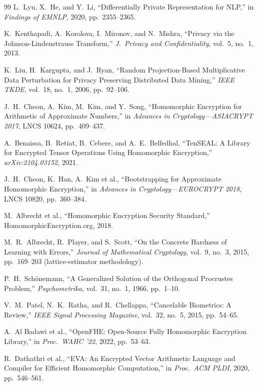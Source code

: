 \documentclass[11pt,a4paper]{article}
\begin{document}
\begin{thebibliography}{99}
 L.\ Lyu, X.\ He, and Y.\ Li, ``Differentially Private
Representation for NLP,'' in \emph{Findings of EMNLP}, 2020,
pp.\ 2355--2365.

 K.\ Kenthapadi, A.\ Korolova, I.\ Mironov, and
N.\ Mishra, ``Privacy via the Johnson-Lindenstrauss Transform,''
\emph{J.\ Privacy and Confidentiality}, vol.\ 5, no.\ 1, 2013.

 K.\ Liu, H.\ Kargupta, and J.\ Ryan,
``Random Projection-Based Multiplicative Data Perturbation for Privacy
Preserving Distributed Data Mining,'' \emph{IEEE TKDE}, vol.\ 18,
no.\ 1, 2006, pp.\ 92--106.

 J.\ H.\ Cheon, A.\ Kim, M.\ Kim, and Y.\ Song,
``Homomorphic Encryption for Arithmetic of Approximate Numbers,'' in
\emph{Advances in Cryptology---ASIACRYPT 2017}, LNCS 10624, pp.\ 409--437.

 A.\ Benaissa, B.\ Retiat, B.\ Cebere, and A.\ E.\
Belfedhal, ``TenSEAL: A Library for Encrypted Tensor Operations Using
Homomorphic Encryption,'' \emph{arXiv:2104.03152}, 2021.

 J.\ H.\ Cheon, K.\ Han, A.\ Kim et al.,
``Bootstrapping for Approximate Homomorphic Encryption,'' in
\emph{Advances in Cryptology---EUROCRYPT 2018}, LNCS 10820,
pp.\ 360--384.

 M.\ Albrecht et al., ``Homomorphic Encryption
Security Standard,'' HomomorphicEncryption.org, 2018.

 M.\ R.\ Albrecht, R.\ Player, and S.\ Scott,
``On the Concrete Hardness of Learning with Errors,'' \emph{Journal of
Mathematical Cryptology}, vol.\ 9, no.\ 3, 2015, pp.\ 169--203
(lattice-estimator methodology).

 P.\ H.\ Sch\"onemann, ``A Generalized Solution
of the Orthogonal Procrustes Problem,'' \emph{Psychometrika}, vol.\ 31,
no.\ 1, 1966, pp.\ 1--10.

 V.\ M.\ Patel, N.\ K.\ Ratha, and R.\ Chellappa,
``Cancelable Biometrics: A Review,'' \emph{IEEE Signal Processing
Magazine}, vol.\ 32, no.\ 5, 2015, pp.\ 54--65.

 A.\ Al Badawi et al., ``OpenFHE: Open-Source Fully
Homomorphic Encryption Library,'' in \emph{Proc.\ WAHC '22},
2022, pp.\ 53--63.

 R.\ Dathathri et al., ``EVA: An Encrypted Vector
Arithmetic Language and Compiler for Efficient Homomorphic
Computation,'' in \emph{Proc.\ ACM PLDI}, 2020, pp.\ 546--561.


\end{thebibliography}
\end{document}
